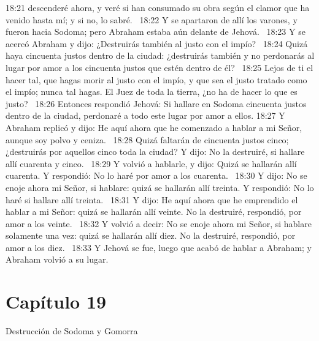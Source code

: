 18:21 descenderé ahora, y veré si han consumado su obra según el clamor que ha venido hasta mí; y si no, lo sabré.  
18:22 Y se apartaron de allí los varones, y fueron hacia Sodoma; pero Abraham estaba aún delante de Jehová.  
18:23 Y se acercó Abraham y dijo: ¿Destruirás también al justo con el impío?  
18:24 Quizá haya cincuenta justos dentro de la ciudad: ¿destruirás también y no perdonarás al lugar por amor a los cincuenta justos que estén dentro de él?  
18:25 Lejos de ti el hacer tal, que hagas morir al justo con el impío, y que sea el justo tratado como el impío; nunca tal hagas. El Juez de toda la tierra, ¿no ha de hacer lo que es justo?  
18:26 Entonces respondió Jehová: Si hallare en Sodoma cincuenta justos dentro de la ciudad, perdonaré a todo este lugar por amor a ellos. 
18:27 Y Abraham replicó y dijo: He aquí ahora que he comenzado a hablar a mi Señor, aunque soy polvo y ceniza.  
18:28 Quizá faltarán de cincuenta justos cinco; ¿destruirás por aquellos cinco toda la ciudad? Y dijo: No la destruiré, si hallare allí cuarenta y cinco.  
18:29 Y volvió a hablarle, y dijo: Quizá se hallarán allí cuarenta. Y respondió: No lo haré por amor a los cuarenta.  
18:30 Y dijo: No se enoje ahora mi Señor, si hablare: quizá se hallarán allí treinta. Y respondió: No lo haré si hallare allí treinta.  
18:31 Y dijo: He aquí ahora que he emprendido el hablar a mi Señor: quizá se hallarán allí veinte. No la destruiré, respondió, por amor a los veinte.  
18:32 Y volvió a decir: No se enoje ahora mi Señor, si hablare solamente una vez: quizá se hallarán allí diez. No la destruiré, respondió, por amor a los diez.  
18:33 Y Jehová se fue, luego que acabó de hablar a Abraham; y Abraham volvió a su lugar.  
\section*{Capítulo 19 }
Destrucción de Sodoma y Gomorra  

